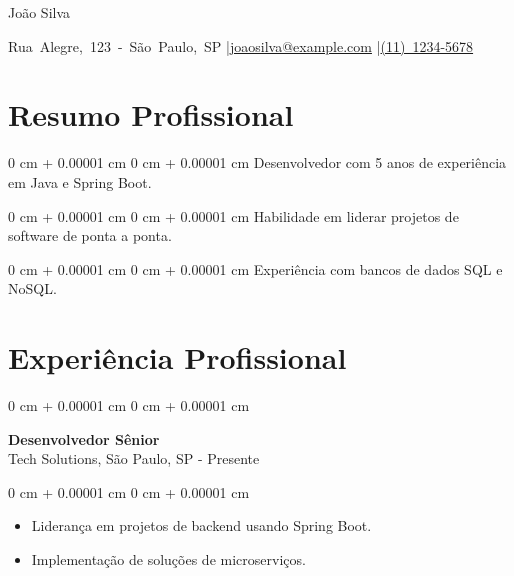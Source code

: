 \documentclass[10pt, letterpaper]{article}
\newenvironment{highlights}{
    \begin{itemize}[
        topsep=0.10 cm,
        parsep=0.10 cm,
        partopsep=0pt,
        itemsep=0pt,
        leftmargin=0 cm + 10pt
    ]
}{
    \end{itemize}
}
\newenvironment{onecolentry}{
    \begin{adjustwidth}{
        0 cm + 0.00001 cm
    }{
        0 cm + 0.00001 cm
    }
}{
    \end{adjustwidth}
}
\newenvironment{header}{
    \setlength{\topsep}{0pt}\par\kern\topsep\centering\linespread{1.5}
}{
    \par\kern\topsep
}
\begin{document}
\begin{header}
    {\fontsize{25pt}{25pt}\selectfont João Silva}

    \vspace{0pt}

    \normalsize
    \mbox{Rua Alegre, 123 - São Paulo, SP} \enskip|\enskip \mbox{\href{mailto:joaosilva@example.com}{joaosilva@example.com}} \enskip|\enskip \mbox{\href{tel:(11)12345678}{(11) 1234-5678}} \\
    
\end{header}

\vspace{5pt - 0.1cm}

\section{Resumo Profissional}
\begin{onecolentry}{Desenvolvedor com 5 anos de experiência em Java e Spring Boot.}\end{onecolentry}
\vspace{0.2cm}
\begin{onecolentry}{Habilidade em liderar projetos de software de ponta a ponta.}\end{onecolentry}
\vspace{0.2cm}
\begin{onecolentry}{Experiência com bancos de dados SQL e NoSQL.}\end{onecolentry}
\section{Experiência Profissional}

\begin{onecolentry}
    \setcolumnwidth{\fill, 4.5cm}
    \begin{paracol}{2}
        \textbf{Desenvolvedor Sênior} \\ Tech Solutions, São Paulo, SP
        \switchcolumn
         - Presente
    \end{paracol}
\end{onecolentry}
\vspace{0.10cm}
\begin{onecolentry}
    \begin{highlights}
                \item Liderança em projetos de backend usando Spring Boot.
                \item Implementação de soluções de microserviços.
    \end{highlights}
\end{onecolentry}
\end{document}
